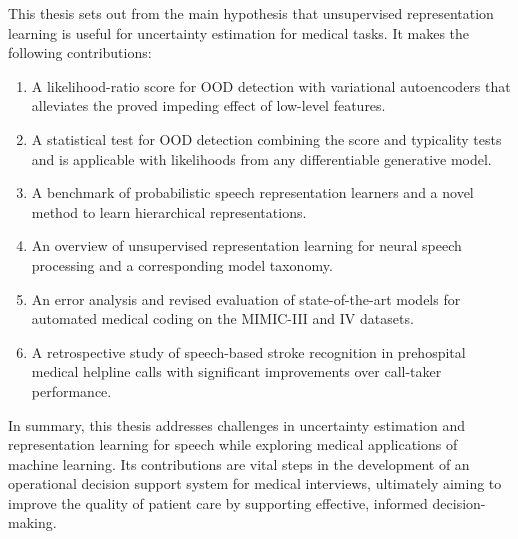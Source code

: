 This thesis sets out from the main hypothesis that unsupervised representation learning is useful for uncertainty estimation for medical tasks. 
It makes the following contributions:
%
\begin{enumerate}[topsep=3pt, partopsep=0pt, itemsep=3pt, parsep=0pt, leftmargin=2em, label=(\alph*)] %
    \item A likelihood-ratio score for OOD detection with variational autoencoders that alleviates the proved impeding effect of low-level features.
    \item A statistical test for OOD detection combining the score and typicality tests and is applicable with likelihoods from any differentiable generative model.
    \item A benchmark of probabilistic speech representation learners and a novel method to learn hierarchical representations.
    \item An overview of unsupervised representation learning for neural speech processing and a corresponding model taxonomy.
    \item An error analysis and revised evaluation of state-of-the-art models for automated medical coding on the MIMIC-III and IV datasets. 
    \item A retrospective study of speech-based stroke recognition in prehospital medical helpline calls with significant improvements over call-taker performance.
\end{enumerate}
%
In summary, this thesis addresses challenges in uncertainty estimation and representation learning for speech while exploring medical applications of machine learning.
Its contributions are vital steps in the development of an operational decision support system for medical interviews, ultimately aiming to improve the quality of patient care by supporting effective, informed decision-making.
